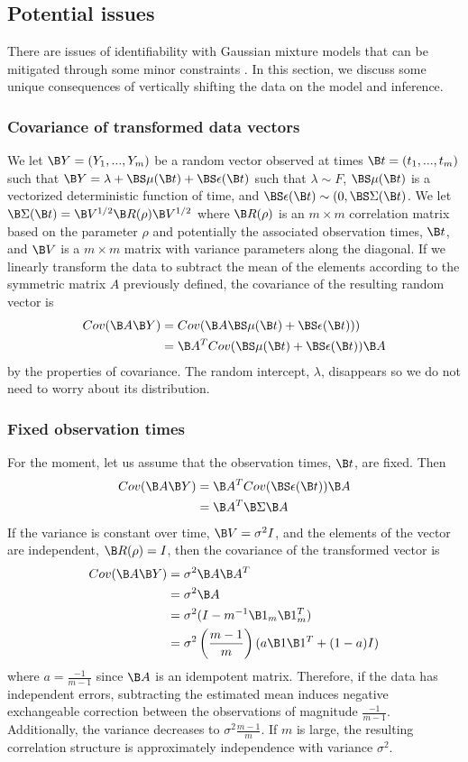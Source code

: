 \subsection{Potential issues}
There are issues of identifiability with Gaussian mixture models that can be mitigated through some minor constraints \cite{mclachlan2000}. In this section, we discuss some unique consequences of vertically shifting the data on the model and inference.

\subsubsection{Covariance of transformed data vectors}
We let $\B Y=(Y_{1},...,Y_{m})$ be a random vector observed at times $\B t=(t_{1},...,t_{m})$ such that
$\B Y = \lambda + \BS\mu(\B t) + \BS\epsilon(\B t)$
such that $\lambda\sim F$, $\BS\mu(\B t)$ is a vectorized deterministic function of time, and $\BS\epsilon(\B t)\sim(0,\BS\Sigma(\B t)$. We let $\B\Sigma(\B t) =\B V^{1/2}\B R(\rho)\B V^{1/2}$ where $\B R(\rho)$ is an $m\times m$ correlation matrix based on the parameter $\rho$ and potentially the associated observation times, $\B t$, and $\B V$ is a $m\times m$ matrix with variance parameters along the diagonal. If we linearly transform the data to subtract the mean of the elements according to the symmetric matrix $A$ previously defined, the covariance of the resulting random vector is
\begin{align*}
Cov(\B A\B Y) &= Cov(\B A\BS\mu(\B t)+\BS\epsilon(\B t)))\\
&= \B A^{T}Cov(\BS\mu(\B t)+\BS\epsilon(\B t))\B A
\end{align*}
by the properties of covariance. The random intercept, $\lambda$, disappears so we do not need to worry about its distribution. 
\subsubsection{Fixed observation times}
For the moment, let us assume that the observation times, $\B t$, are fixed. Then
\begin{align*}
Cov(\B A\B Y)&= \B A^{T}Cov(\BS\epsilon(\B t))\B A\\
&= \B A^{T}\B\Sigma \B A
\end{align*}
If the variance is constant over time, $\B V=\sigma^{2}I$, and the elements of the vector are independent, $\B R(\rho)=I$, then the covariance of the transformed vector is
\begin{align*} 
Cov(\B A\B Y) &= \sigma^{2}\B A\B A^{T} \\
&=\sigma^{2}\B A\\
&= \sigma^{2}(I - m^{-1}\B1_{m}\B1_{m}^{T})\\
&=\sigma^{2}\left(\frac{m-1}{m}\right)(a\B 1\B 1^{T}+ (1-a)I)
\end{align*}
 where $a=\frac{-1}{m-1}$ since $\B A$ is an idempotent matrix. Therefore, if the data has independent errors, subtracting the estimated mean induces negative exchangeable correction between the observations of magnitude $\frac{-1}{m-1}$. Additionally, the variance decreases to $\sigma^{2}\frac{m-1}{m}$. If $m$ is large, the resulting correlation structure is approximately independence with variance $\sigma^{2}$.
 
